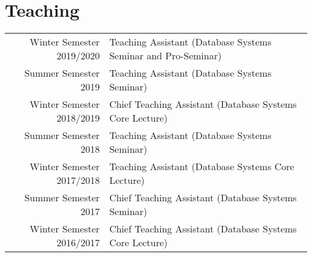 \documentclass[a4paper,10pt]{article} %
\begin{document}
\section{Teaching}
\begin{tabular}{rl}
Winter Semester 2019/2020 & Teaching Assistant (Database Systems Seminar and Pro-Seminar)\\
Summer Semester 2019 & Teaching Assistant (Database Systems Seminar)\\
Winter Semester 2018/2019 & Chief Teaching Assistant (Database Systems Core Lecture)\\
Summer Semester 2018 & Teaching Assistant (Database Systems Seminar)\\
Winter Semester 2017/2018 & Teaching Assistant (Database Systems Core Lecture)\\
Summer Semester 2017 & Chief Teaching Assistant (Database Systems Seminar)\\
Winter Semester 2016/2017 & Chief Teaching Assistant (Database Systems Core Lecture)
\end{tabular}


\end{document}
